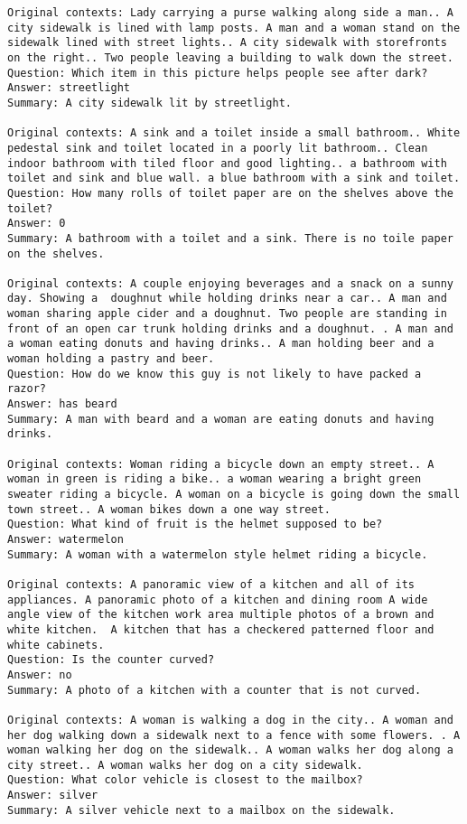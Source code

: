 \documentclass[10pt,twocolumn,letterpaper]{article}
\begin{document}
\begin{tiny}
\begin{lstlisting}[breaklines]
Original contexts: Lady carrying a purse walking along side a man.. A city sidewalk is lined with lamp posts. A man and a woman stand on the sidewalk lined with street lights.. A city sidewalk with storefronts on the right.. Two people leaving a building to walk down the street.
Question: Which item in this picture helps people see after dark?
Answer: streetlight
Summary: A city sidewalk lit by streetlight.

Original contexts: A sink and a toilet inside a small bathroom.. White pedestal sink and toilet located in a poorly lit bathroom.. Clean indoor bathroom with tiled floor and good lighting.. a bathroom with toilet and sink and blue wall. a blue bathroom with a sink and toilet.
Question: How many rolls of toilet paper are on the shelves above the toilet?
Answer: 0
Summary: A bathroom with a toilet and a sink. There is no toile paper on the shelves.

Original contexts: A couple enjoying beverages and a snack on a sunny day. Showing a  doughnut while holding drinks near a car.. A man and woman sharing apple cider and a doughnut. Two people are standing in front of an open car trunk holding drinks and a doughnut. . A man and a woman eating donuts and having drinks.. A man holding beer and a woman holding a pastry and beer.
Question: How do we know this guy is not likely to have packed a razor?
Answer: has beard
Summary: A man with beard and a woman are eating donuts and having drinks.

Original contexts: Woman riding a bicycle down an empty street.. A woman in green is riding a bike.. a woman wearing a bright green sweater riding a bicycle. A woman on a bicycle is going down the small town street.. A woman bikes down a one way street.
Question: What kind of fruit is the helmet supposed to be?
Answer: watermelon
Summary: A woman with a watermelon style helmet riding a bicycle.

Original contexts: A panoramic view of a kitchen and all of its appliances. A panoramic photo of a kitchen and dining room A wide angle view of the kitchen work area multiple photos of a brown and white kitchen.  A kitchen that has a checkered patterned floor and white cabinets.
Question: Is the counter curved?
Answer: no
Summary: A photo of a kitchen with a counter that is not curved.

Original contexts: A woman is walking a dog in the city.. A woman and her dog walking down a sidewalk next to a fence with some flowers. . A woman walking her dog on the sidewalk.. A woman walks her dog along a city street.. A woman walks her dog on a city sidewalk.
Question: What color vehicle is closest to the mailbox?
Answer: silver
Summary: A silver vehicle next to a mailbox on the sidewalk.


\end{lstlisting}
\end{tiny}
\end{document}
